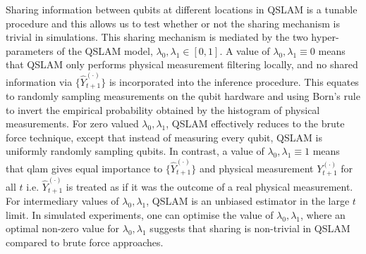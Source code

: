 Sharing information between qubits at different locations in QSLAM is a tunable procedure and this allows us to test whether or not the sharing mechanism is trivial in simulations. This sharing mechanism is mediated by the two hyper-parameters of the QSLAM model, $\lambda_0, \lambda_1 \in [0, 1]$. A value of $\lambda_0, \lambda_1 \equiv 0$  means that QSLAM only performs physical measurement filtering locally, and no shared information via $\{\hat{Y}_{t+1}^{(\cdot)} \}$ is incorporated into the inference procedure. This equates to randomly sampling measurements on the qubit hardware and using Born's rule to invert the empirical probability obtained by the histogram of physical measurements. For zero valued $\lambda_0, \lambda_1$, QSLAM effectively reduces to the brute force technique, except that instead of measuring every qubit, QSLAM is uniformly randomly sampling qubits.  In contrast, a value of $\lambda_0, \lambda_1 \equiv 1$ means that qlam gives equal importance to $\{\hat{Y}_{t+1}^{(\cdot)} \}$ and  physical measurement $Y_{t+1}^{(\cdot)} $ for all $t$ i.e. $\hat{Y}_{t+1}^{(\cdot)}$ is treated as if it was the outcome of a real physical measurement. For intermediary values of $\lambda_0, \lambda_1$, QSLAM is an unbiased estimator in the large $t$ limit. In simulated experiments, one can optimise the value of  $\lambda_0, \lambda_1$, where an optimal non-zero value for $\lambda_0, \lambda_1$ suggests that sharing is non-trivial in QSLAM compared to brute force approaches.

